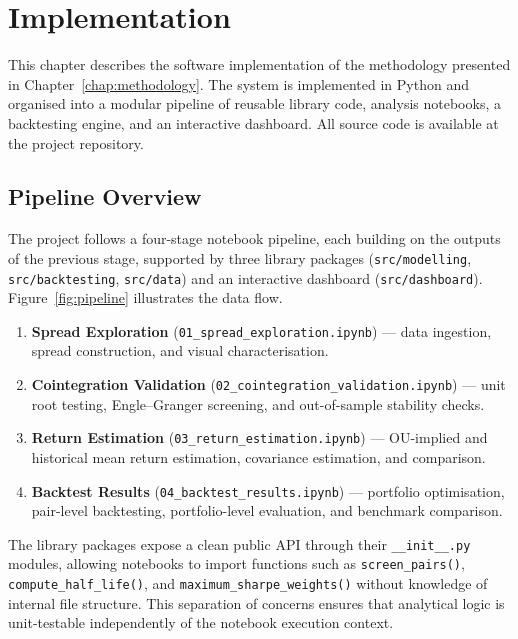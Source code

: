 \documentclass[a4paper]{report}
\begin{document}
\chapter{Implementation}
\label{chap:implementation}

This chapter describes the software implementation of the methodology presented in Chapter~\ref{chap:methodology}. The system is implemented in Python and organised into a modular pipeline of reusable library code, analysis notebooks, a backtesting engine, and an interactive dashboard. All source code is available at the project repository.

\section{Pipeline Overview}
\label{sec:pipeline_overview}

The project follows a four-stage notebook pipeline, each building on the outputs of the previous stage, supported by three library packages (\texttt{src/modelling}, \texttt{src/backtesting}, \texttt{src/data}) and an interactive dashboard (\texttt{src/dashboard}). Figure~\ref{fig:pipeline} illustrates the data flow.

\begin{enumerate}
    \item \textbf{Spread Exploration} (\texttt{01\_spread\_exploration.ipynb}) --- data ingestion, spread construction, and visual characterisation.
    \item \textbf{Cointegration Validation} (\texttt{02\_cointegration\_validation.ipynb}) --- unit root testing, Engle--Granger screening, and out-of-sample stability checks.
    \item \textbf{Return Estimation} (\texttt{03\_return\_estimation.ipynb}) --- OU-implied and historical mean return estimation, covariance estimation, and comparison.
    \item \textbf{Backtest Results} (\texttt{04\_backtest\_results.ipynb}) --- portfolio optimisation, pair-level backtesting, portfolio-level evaluation, and benchmark comparison.
\end{enumerate}

The library packages expose a clean public API through their \texttt{\_\_init\_\_.py} modules, allowing notebooks to import functions such as \texttt{screen\_pairs()}, \texttt{compute\_half\_life()}, and \texttt{maximum\_sharpe\_weights()} without knowledge of internal file structure. This separation of concerns ensures that analytical logic is unit-testable independently of the notebook execution context.
\end{document}
